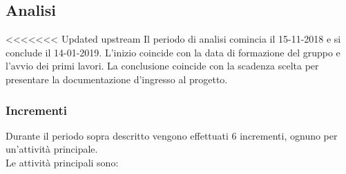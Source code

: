 \subsection{Analisi}

<<<<<<< Updated upstream
Il periodo di analisi comincia il 15-11-2018 e si conclude il 14-01-2019. L'inizio coincide con la data di formazione del gruppo e l'avvio dei primi lavori. La conclusione coincide con la scadenza scelta per presentare la documentazione d'ingresso al progetto.

\subsubsection{Incrementi}
Durante il periodo sopra descritto vengono effettuati 6 incrementi, ognuno per un'attività principale.\\
Le attività principali sono:
